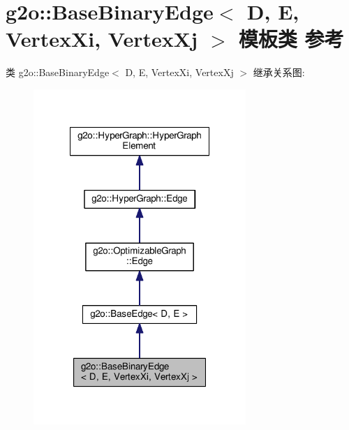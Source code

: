 \hypertarget{classg2o_1_1BaseBinaryEdge}{\section{g2o\-:\-:Base\-Binary\-Edge$<$ D, E, Vertex\-Xi, Vertex\-Xj $>$ 模板类 参考}
\label{classg2o_1_1BaseBinaryEdge}
}


类 g2o\-:\-:Base\-Binary\-Edge$<$ D, E, Vertex\-Xi, Vertex\-Xj $>$ 继承关系图\-:
\nopagebreak
\begin{figure}[H]
\begin{center}
\leavevmode
\includegraphics[width=228pt]{classg2o_1_1BaseBinaryEdge__inherit__graph}
\end{center}
\end{figure}


